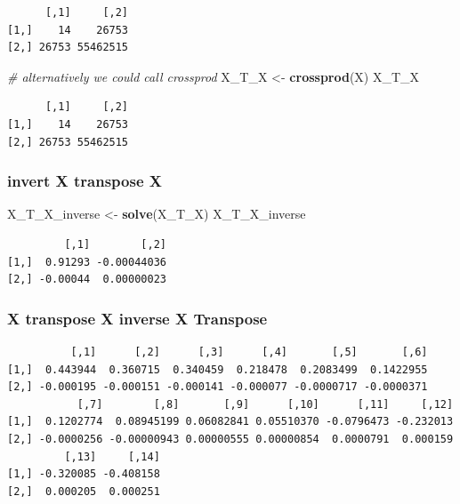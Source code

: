 \documentclass[]{book}
\newenvironment{Shaded}{\begin{snugshade}}{\end{snugshade}}
\newcommand{\CommentTok}[1]{\textcolor[rgb]{0.56,0.35,0.01}{\textit{#1}}}
\newcommand{\KeywordTok}[1]{\textcolor[rgb]{0.13,0.29,0.53}{\textbf{#1}}}
\newcommand{\NormalTok}[1]{#1}
\newcommand{\OperatorTok}[1]{\textcolor[rgb]{0.81,0.36,0.00}{\textbf{#1}}}
\newcommand{\StringTok}[1]{\textcolor[rgb]{0.31,0.60,0.02}{#1}}
\begin{document}
\begin{verbatim}
      [,1]     [,2]
[1,]    14    26753
[2,] 26753 55462515
\end{verbatim}

\begin{Shaded}
\begin{Highlighting}[]
\CommentTok{# alternatively we could call crossprod}
\NormalTok{X_T_X <-}\StringTok{ }\KeywordTok{crossprod}\NormalTok{(X)}
\NormalTok{X_T_X}
\end{Highlighting}
\end{Shaded}

\begin{verbatim}
      [,1]     [,2]
[1,]    14    26753
[2,] 26753 55462515
\end{verbatim}

\hypertarget{invert-x-transpose-x}{%
\subsubsection{invert X transpose X}\label{invert-x-transpose-x}}

\begin{Shaded}
\begin{Highlighting}[]
\NormalTok{X_T_X_inverse <-}\StringTok{ }\KeywordTok{solve}\NormalTok{(X_T_X)}
\NormalTok{X_T_X_inverse}
\end{Highlighting}
\end{Shaded}

\begin{verbatim}
         [,1]        [,2]
[1,]  0.91293 -0.00044036
[2,] -0.00044  0.00000023
\end{verbatim}

\hypertarget{x-transpose-x-inverse-x-transpose}{%
\subsubsection{X transpose X inverse X Transpose}\label{x-transpose-x-inverse-x-transpose}}

\begin{Shaded}
\end{Shaded}

\begin{verbatim}
          [,1]      [,2]      [,3]      [,4]       [,5]       [,6]
[1,]  0.443944  0.360715  0.340459  0.218478  0.2083499  0.1422955
[2,] -0.000195 -0.000151 -0.000141 -0.000077 -0.0000717 -0.0000371
           [,7]        [,8]       [,9]      [,10]      [,11]     [,12]
[1,]  0.1202774  0.08945199 0.06082841 0.05510370 -0.0796473 -0.232013
[2,] -0.0000256 -0.00000943 0.00000555 0.00000854  0.0000791  0.000159
         [,13]     [,14]
[1,] -0.320085 -0.408158
[2,]  0.000205  0.000251
\end{verbatim}
\end{document}

